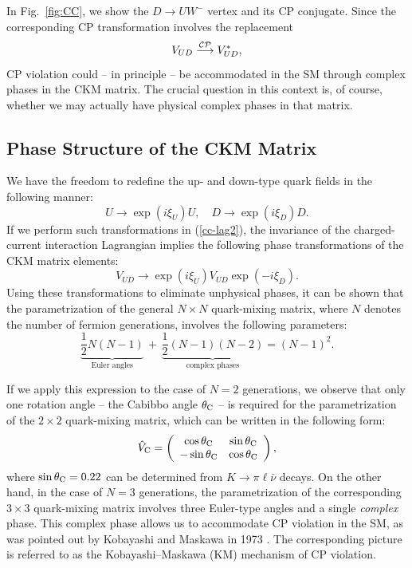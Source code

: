 \documentclass[11pt]{cernrep}
\begin{document}
In Fig.~\ref{fig:CC}, we show the $D\to U W^-$ vertex and its CP 
conjugate. Since the corresponding CP transformation involves the 
replacement
\begin{equation}\label{CKM-CP}
V_{UD}\stackrel{{\cal CP}}{\longrightarrow}V_{UD}^\ast,
\end{equation}
CP violation could -- in principle -- be accommodated in the SM through 
complex phases in the CKM matrix. The crucial question in this context
is, of course, whether we may actually have physical complex phases in 
that matrix.


%
%
%
\subsection{Phase Structure of the CKM Matrix}
%
%
%
We have the freedom to redefine the up- and down-type quark fields
in the following manner:
\begin{equation}
U\to \exp(i\xi_U)U,\quad D\to \exp(i\xi_D)D. 
\end{equation}
If we perform such transformations in (\ref{cc-lag2}), the invariance 
of the charged-current interaction Lagrangian implies the 
following phase transformations of the CKM matrix elements:
\begin{equation}\label{CKM-trafo}
V_{UD}\to\exp(i\xi_U)V_{UD}\exp(-i\xi_D).
\end{equation}
Using these transformations to eliminate unphysical phases, it can be shown 
that the parametrization of the general $N\times N$ quark-mixing matrix, 
where $N$ denotes the number of fermion generations, involves the following 
parameters:
\begin{equation}
\underbrace{\frac{1}{2}N(N-1)}_{\mbox{Euler angles}} \, + \,
\underbrace{\frac{1}{2}(N-1)(N-2)}_{\mbox{complex phases}}=
(N-1)^2.
\end{equation}

If we apply this expression to the case of $N=2$ generations, we observe
that only one rotation angle -- the Cabibbo angle $\theta_{\rm C}$
\cite{cab} -- is required for the parametrization of the $2\times2$
quark-mixing matrix, which can be written in the following form:
\begin{equation}\label{Cmatrix}
\hat V_{\rm C}=\left(\begin{array}{cc}
\cos\theta_{\rm C}&\sin\theta_{\rm C}\\
-\sin\theta_{\rm C}&\cos\theta_{\rm C}
\end{array}\right),
\end{equation}
where $\sin\theta_{\rm C}=0.22$ can be determined from $K\to\pi\ell\bar\nu$ 
decays. On the other hand, in the case of $N=3$ generations, the 
parametrization of the corresponding $3\times3$ quark-mixing matrix involves 
three Euler-type angles and a single {\it complex} phase. This complex phase 
allows us to accommodate CP violation in the SM, as was pointed out by 
Kobayashi and Maskawa in 1973 \cite{KM}. The corresponding picture
is referred to as the Kobayashi--Maskawa (KM) mechanism of CP violation.
\end{document}
